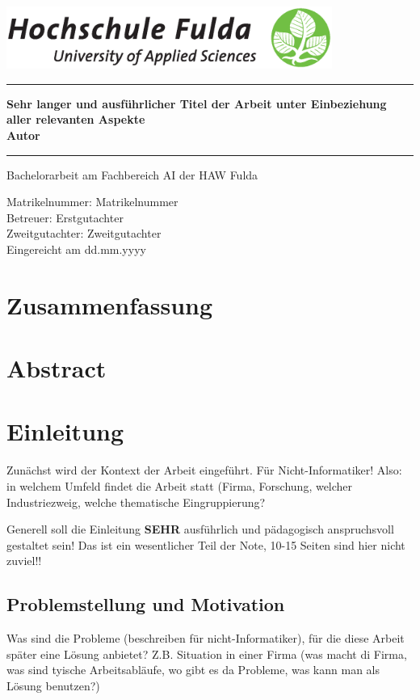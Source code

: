 \documentclass[12pt,oneside]{article}
\newcommand{\HSFTitle}[8]{

  \thispagestyle{empty}
\begin{center}
    \includegraphics[width=0.8\textwidth]{logo.eps} \\
    \vspace*{\stretch{1}}
    \end{center}

  {\parindent0cm
  \rule{\linewidth}{.7ex}}
  \begin{center}
    \vspace*{\stretch{1}}
    \sffamily\bfseries\Huge
    #1\\
    \vspace*{\stretch{1}}
    \sffamily\bfseries\large
    #3
    \vspace*{\stretch{1}}
  \end{center}
  \rule{\linewidth}{.7ex}

  \vspace*{\stretch{2}}
  \begin{center}
    \Large #2 am #5 der HAW Fulda \\
    \vspace*{\stretch{1}}

    \large Matrikelnummer:  #4 \\[1mm]
    \large Betreuer:  #7 \\[1mm]
    \large Zweitgutachter:  #8 \\[1mm]

    \vspace*{\stretch{1}}
    \large Eingereicht am #6
  \end{center}
}
\begin{document}
  \HSFTitle
      {Sehr langer und ausführlicher Titel der Arbeit unter Einbeziehung aller relevanten Aspekte }        %
      {Bachelorarbeit} %
      {Autor}          %
      {Matrikelnummer}
      {Fachbereich AI}  %
      {dd.mm.yyyy}        %
      {Erstgutachter}     %
      {Zweitgutachter}    %

  \clearpage

\lhead{}
    \setcounter{page}{1}

\clearpage
{}
\section*{Zusammenfassung}
\blindtext
%
\section*{Abstract}
\blindtext



\clearpage
\tableofcontents
\clearpage

\listoffigures

\listoftables
\clearpage


\cleardoublepage
{}
    \setcounter{page}{1}
\lhead{\nouppercase{\leftmark}}


\section{Einleitung} \label{sec:einleitung}
Zunächst wird der Kontext der Arbeit eingeführt. Für Nicht-Informatiker! Also: in welchem Umfeld findet die Arbeit statt (Firma, Forschung, welcher Industriezweig, welche thematische Eingruppierung?

Generell soll die Einleitung \textbf{SEHR} ausführlich und pädagogisch anspruchsvoll gestaltet sein! Das ist ein wesentlicher Teil der Note, 10-15 Seiten sind hier nicht zuviel!!

\subsection{Problemstellung und Motivation}
Was sind die Probleme (beschreiben für nicht-Informatiker), für die diese Arbeit später eine Lösung anbietet? Z.B. Situation in einer Firma (was macht di Firma, was sind tyische Arbeitsabläufe, wo gibt es da Probleme, was kann man als Lösung benutzen?)
\end{document}
